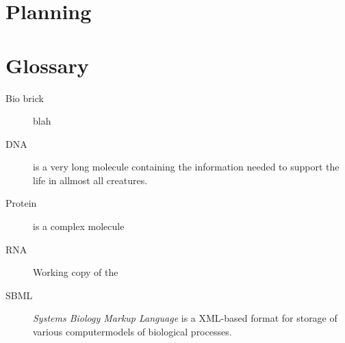 \documentclass[a4paper]{article}
\begin{document}
\section{Planning}  %
\section{Glossary} %
\begin{description}
	\item[Bio brick] blah
	\item[DNA]  is a very long molecule containing the information needed to support the life in allmost all creatures.
	\item[Protein] is a complex molecule
	\item[RNA] Working copy of the
	\item[SBML] \textit{Systems Biology Markup Language} is a XML-based format for storage of various computermodels of biological processes.
\end{description}
\end{document}
